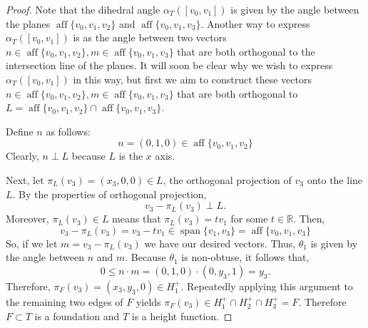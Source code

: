 \documentclass[10pt,a4paper]{amsart}
\begin{document}
\begin{proof}
	Note that the dihedral angle $\alpha_T([v_0,v_1])$ is given by the angle between the planes $\operatorname{aff}\{v_0,v_1,v_2\}$ and $\operatorname{aff}\{v_0,v_1,v_3\}$. Another way to express $\alpha_T([v_0,v_1])$ is as the angle between two vectors $n\in \operatorname{aff}\{v_0,v_1,v_2\}, m\in \operatorname{aff}\{v_0,v_1,v_3\}$ that are both orthogonal to the intersection line of the planes. It will soon be clear why we wish to express $\alpha_T([v_0,v_1])$ in this way, but first we aim to construct these vectors $n\in \operatorname{aff}\{v_0,v_1,v_2\}, m\in \operatorname{aff}\{v_0,v_1,v_3\}$ that are both orthogonal to $L=\operatorname{aff}\{v_0,v_1,v_2\} \cap \operatorname{aff}\{v_0,v_1,v_3\}$.
	
	Define $n$ as follows:
	\[
	n=(0,1,0)\in \operatorname{aff}\{v_0,v_1,v_2\}
	\]  
	Clearly, $n \perp L$ because $L$ is the $x$ axis.
	
	Next, let $\pi_L(v_3) = (x_3,0,0) \in L$, the orthogonal projection of $v_3$ onto the line $L$. By the properties of orthogonal projection,
	\begin{equation*}
		v_3-\pi_L(v_3) \perp L.
	\end{equation*}
	Moreover, $\pi_L(v_3)\in L$ means that $\pi_L(v_3) =tv_1$ for some $t\in \mathbb{R}$. Then, 
	\[
	v_3-\pi_L(v_3) = v_3-tv_1\in \operatorname{span}\{v_1,v_3\}=\operatorname{aff}\{v_0,v_1,v_3\}
	\]
	So, if we let $m= v_3-\pi_L(v_3)$ we have our desired vectors.
	Thus, $\theta_1$ is given by the angle between $n$ and $m$.
	Because $\theta_1$ is non-obtuse, it follows that,
	\begin{equation*}
		0\le n\cdot m = (0,1,0)\cdot(0,y_3,1) = y_3.
	\end{equation*}
	Therefore, $\pi_F(v_3) = (x_3,y_3,0) \in H_1^+$. Repeatedly applying this argument to the remaining     two edges of $F$ yields $\pi_F(v_3) \in H_1^+\cap H_2^+ \cap H_3^+ =F$. Therefore $F\subset T$ is a foundation and $T$ is a height function.
	
	
	
	
\end{proof}
\end{document}
